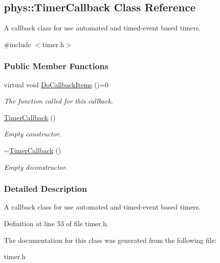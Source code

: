 \hypertarget{classphys_1_1TimerCallback}{
\subsection{phys::TimerCallback Class Reference}
\label{classphys_1_1TimerCallback}
}


A callback class for use automated and timed-\/event based timers.  




{\ttfamily \#include $<$timer.h$>$}

\subsubsection*{Public Member Functions}
\begin{DoxyCompactItemize}
\item 
\hypertarget{classphys_1_1TimerCallback_a8ceb51cd1b902e243e35cff61f4ae9d9}{
virtual void \hyperlink{classphys_1_1TimerCallback_a8ceb51cd1b902e243e35cff61f4ae9d9}{DoCallbackItems} ()=0}
\label{classphys_1_1TimerCallback_a8ceb51cd1b902e243e35cff61f4ae9d9}

\begin{DoxyCompactList}\small\item\em The function called for this callback. \item\end{DoxyCompactList}\item 
\hypertarget{classphys_1_1TimerCallback_a8500d48fd294a0513a0a401423e2c122}{
\hyperlink{classphys_1_1TimerCallback_a8500d48fd294a0513a0a401423e2c122}{TimerCallback} ()}
\label{classphys_1_1TimerCallback_a8500d48fd294a0513a0a401423e2c122}

\begin{DoxyCompactList}\small\item\em Empty constructor. \item\end{DoxyCompactList}\item 
\hypertarget{classphys_1_1TimerCallback_a97422dd56db0f37f2b4103ba83f1da9b}{
\hyperlink{classphys_1_1TimerCallback_a97422dd56db0f37f2b4103ba83f1da9b}{$\sim$TimerCallback} ()}
\label{classphys_1_1TimerCallback_a97422dd56db0f37f2b4103ba83f1da9b}

\begin{DoxyCompactList}\small\item\em Empty deconstructor. \item\end{DoxyCompactList}\end{DoxyCompactItemize}


\subsubsection{Detailed Description}
A callback class for use automated and timed-\/event based timers. 

Definition at line 53 of file timer.h.



The documentation for this class was generated from the following file:\begin{DoxyCompactItemize}
\item 
timer.h\end{DoxyCompactItemize}
